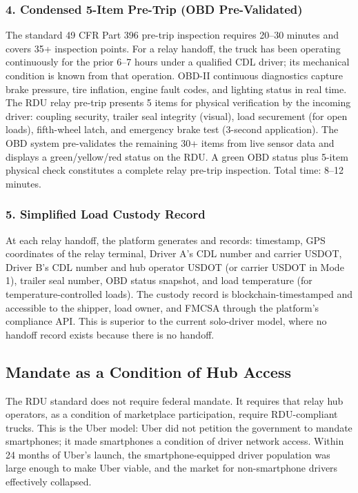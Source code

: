\subsubsection*{4. Condensed 5-Item Pre-Trip (OBD Pre-Validated)}

The standard 49 CFR Part 396 pre-trip inspection requires 20--30 minutes and covers 35+ inspection points. For a relay handoff, the truck has been operating continuously for the prior 6--7 hours under a qualified CDL driver; its mechanical condition is known from that operation. OBD-II continuous diagnostics capture brake pressure, tire inflation, engine fault codes, and lighting status in real time. The RDU relay pre-trip presents 5 items for physical verification by the incoming driver: coupling security, trailer seal integrity (visual), load securement (for open loads), fifth-wheel latch, and emergency brake test (3-second application). The OBD system pre-validates the remaining 30+ items from live sensor data and displays a green/yellow/red status on the RDU. A green OBD status plus 5-item physical check constitutes a complete relay pre-trip inspection. Total time: 8--12 minutes.

\subsubsection*{5. Simplified Load Custody Record}

At each relay handoff, the platform generates and records: timestamp, GPS coordinates of the relay terminal, Driver A's CDL number and carrier USDOT, Driver B's CDL number and hub operator USDOT (or carrier USDOT in Mode 1), trailer seal number, OBD status snapshot, and load temperature (for temperature-controlled loads). The custody record is blockchain-timestamped and accessible to the shipper, load owner, and FMCSA through the platform's compliance API. This is superior to the current solo-driver model, where no handoff record exists because there is no handoff.

\subsection{Mandate as a Condition of Hub Access}

The RDU standard does not require federal mandate. It requires that relay hub operators, as a condition of marketplace participation, require RDU-compliant trucks. This is the Uber model: Uber did not petition the government to mandate smartphones; it made smartphones a condition of driver network access. Within 24 months of Uber's launch, the smartphone-equipped driver population was large enough to make Uber viable, and the market for non-smartphone drivers effectively collapsed.


